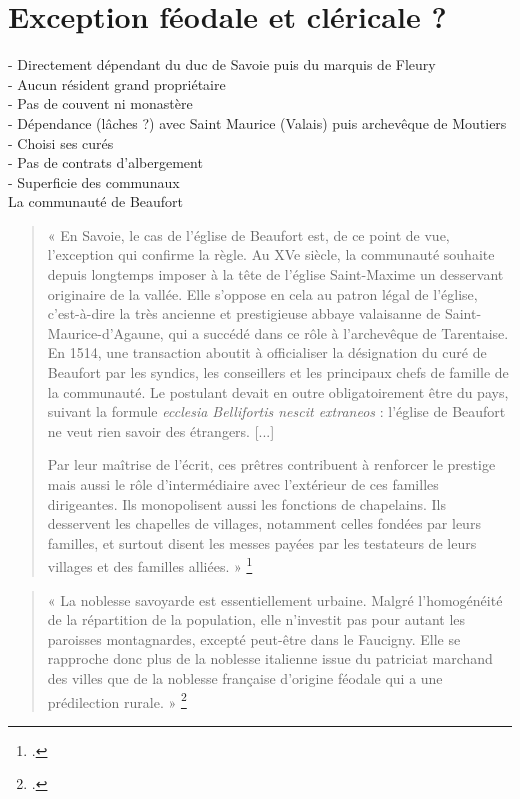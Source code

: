 \documentclass[12pt,a4paper]{report}
\begin{document}
\section{Exception féodale et cléricale ?}
	-	Directement dépendant du duc de Savoie puis du marquis de Fleury\\
	-	Aucun résident grand propriétaire\\
	-	Pas de couvent ni monastère\\
	-	Dépendance (lâches ?) avec Saint Maurice (Valais) puis archevêque de Moutiers\\
	-	Choisi ses curés\\
	-	Pas de contrats d’albergement\\
	-	Superficie des communaux\\
	
	La communauté de Beaufort
	
		\begin{quote}
		« En Savoie, le cas de l’église de Beaufort est, de ce point de vue, 
		l’exception qui confirme la règle. Au XVe siècle, la communauté souhaite 
		depuis longtemps imposer à la tête de l’église Saint-Maxime un desservant 
		originaire de la vallée. Elle s’oppose en cela au patron légal de l’église, 
		c’est-à-dire la très ancienne et prestigieuse abbaye valaisanne de 
		Saint-Maurice-d’Agaune, qui a succédé dans ce rôle à l’archevêque de 
		Tarentaise. En 1514, une transaction aboutit à officialiser la désignation du 
		curé de Beaufort par les syndics, les conseillers et les principaux chefs de 
		famille de la communauté. Le postulant devait en outre obligatoirement être 
		du pays, suivant la formule \textit{ecclesia Bellifortis nescit extraneos} : 
		l’église de Beaufort ne veut rien savoir des étrangers. [...]
		
		Par leur maîtrise de l’écrit, ces prêtres contribuent à renforcer le prestige 
		mais aussi le rôle d’intermédiaire avec l’extérieur de ces familles dirigeantes. 
		Ils monopolisent aussi les fonctions de chapelains. Ils desservent les chapelles 
		de villages, notamment celles fondées par leurs familles, et surtout disent les 
		messes payées par les testateurs de leurs villages et des familles alliées. »
		\footcite[148--149]{CarrierMouthon2010PaysansAlpes}
	\end{quote}
	
		\begin{quote}
		« La noblesse savoyarde est essentiellement urbaine. Malgré l’homogénéité de la répartition de la population, elle n’investit pas pour autant les paroisses montagnardes, excepté peut-être dans le Faucigny. Elle se rapproche donc plus de la noblesse italienne issue du patriciat marchand des villes que de la noblesse française d’origine féodale qui a une prédilection rurale. »
		\footcite[140]{Gachet2011GabelleSel1561}
	\end{quote}
	
\end{document}
